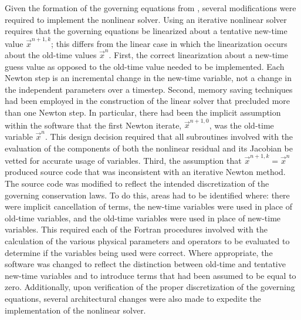 Given the formation of the governing equations from , several modifications were required to implement the nonlinear solver.
Using an iterative nonlinear solver requires that the governing equations be linearized about a tentative new-time value $\vec{x}^{n+1, k}$; this differs from the linear case in which the linearization occurs about the old-time values $\vec{x}^{n}$.
First, the correct linearization about a new-time guess value as opposed to the old-time value needed to be implemented.
Each Newton step is an incremental change in the new-time variable, not a change in the independent parameters over a timestep.
Second, memory saving techniques had been employed in the construction of the linear solver that precluded more than one Newton step.
In particular, there had been the implicit assumption within the software that the first Newton iterate, $\vec{x}^{n+1, 0}$, was the old-time variable $\vec{x}^{n}$.
This design decision required that all subroutines involved with the evaluation of the components of both the nonlinear residual and its Jacobian be vetted for accurate usage of variables.
Third, the assumption that $\vec{x}^{n+1, k} = \vec{x}^{n}$ produced source code that was inconsistent with an iterative Newton method.
The source code was modified to reflect the intended discretization of the governing conservation laws.
To do this, areas had to be identified where: there were implicit cancellation of terms, the new-time variables were used in place of old-time variables, and the old-time variables were used in place of new-time variables.
This required each of the Fortran procedures involved with the calculation of the various physical parameters and operators to be evaluated to determine if the variables being used were correct.
Where appropriate, the software was changed to reflect the distinction between old-time and tentative new-time variables and to introduce terms that had been assumed to be equal to zero.
Additionally, upon verification of the proper discretization of the governing equations, several architectural changes were also made to expedite the implementation of the nonlinear solver.

